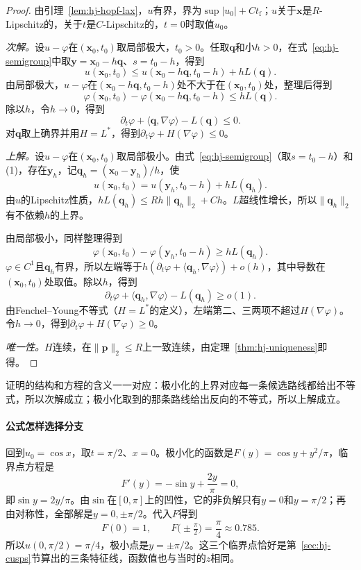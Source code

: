 \begin{proof}
由引理~\ref{lem:hj-hopf-lax}，$u$有界，界为$\sup\lvert u_0\rvert+Ct_{\mathrm{f}}$；$u$关于$\bm{x}$是$R$-Lipschitz的，关于$t$是$C$-Lipschitz的，$t=0$时取值$u_0$。

\emph{次解。}设$u-\varphi$在$(\bm{x}_0,t_0)$取局部极大，$t_0>0$。任取$\bm{q}$和小$h>0$，在式~\eqref{eq:hj-semigroup}中取$\bm{y}=\bm{x}_0-h\bm{q}$、$s=t_0-h$，得到
\[
  u(\bm{x}_0,t_0)\leq u(\bm{x}_0-h\bm{q},t_0-h)+hL(\bm{q}).
\]
由局部极大，$u-\varphi$在$(\bm{x}_0-h\bm{q},t_0-h)$处不大于在$(\bm{x}_0,t_0)$处，整理后得到
\[
  \varphi(\bm{x}_0,t_0)-\varphi(\bm{x}_0-h\bm{q},t_0-h)\leq hL(\bm{q}).
\]
除以$h$，令$h\to0$，得到
\[
  \partial_t\varphi+\langle\bm{q},\nabla\varphi\rangle-L(\bm{q})\leq0.
\]
对$\bm{q}$取上确界并用$H=L^*$，得到$\partial_t\varphi+H(\nabla\varphi)\leq0$。

\emph{上解。}设$u-\varphi$在$(\bm{x}_0,t_0)$取局部极小。由式~\eqref{eq:hj-semigroup}（取$s=t_0-h$）和(1)，存在$\bm{y}_h$，记$\bm{q}_h=(\bm{x}_0-\bm{y}_h)/h$，使
\[
  u(\bm{x}_0,t_0)=u(\bm{y}_h,t_0-h)+hL(\bm{q}_h).
\]
由$u$的Lipschitz性质，$hL(\bm{q}_h)\leq Rh\lVert\bm{q}_h\rVert_2+Ch$。$L$超线性增长，所以$\lVert\bm{q}_h\rVert_2$有不依赖$h$的上界。

由局部极小，同样整理得到
\[
  \varphi(\bm{x}_0,t_0)-\varphi(\bm{y}_h,t_0-h)\geq hL(\bm{q}_h).
\]
$\varphi\in C^1$且$\bm{q}_h$有界，所以左端等于$h(\partial_t\varphi+\langle\bm{q}_h,\nabla\varphi\rangle)+o(h)$，其中导数在$(\bm{x}_0,t_0)$处取值。除以$h$，得到
\[
  \partial_t\varphi+\langle\bm{q}_h,\nabla\varphi\rangle-L(\bm{q}_h)\geq o(1).
\]
由Fenchel--Young不等式（$H=L^*$的定义），左端第二、三两项不超过$H(\nabla\varphi)$。令$h\to0$，得到$\partial_t\varphi+H(\nabla\varphi)\geq0$。

\emph{唯一性。}$H$连续，在$\lVert\bm{p}\rVert_2\leq R$上一致连续，由定理~\ref{thm:hj-uniqueness}即得。
\end{proof}

证明的结构和方程的含义一一对应：极小化的上界对应每一条候选路线都给出不等式，所以次解成立；极小化取到的那条路线给出反向的不等式，所以上解成立。

\paragraph{公式怎样选择分支}
回到$u_0=\cos x$，取$t=\pi/2$、$x=0$。极小化的函数是$F(y)=\cos y+y^2/\pi$，临界点方程是
\[
  F'(y)=-\sin y+\frac{2y}{\pi}=0,
\]
即$\sin y=2y/\pi$。由$\sin$在$[0,\pi]$上的凹性，它的非负解只有$y=0$和$y=\pi/2$；再由对称性，全部解是$y=0,\pm\pi/2$。代入$F$得到
\[
  F(0)=1,\qquad F\bigl(\pm\tfrac{\pi}{2}\bigr)=\frac{\pi}{4}\approx0.785.
\]
所以$u(0,\pi/2)=\pi/4$，极小点是$y=\pm\pi/2$。这三个临界点恰好是第~\ref{sec:hj-cusps}节算出的三条特征线，函数值也与当时的$z$相同。

